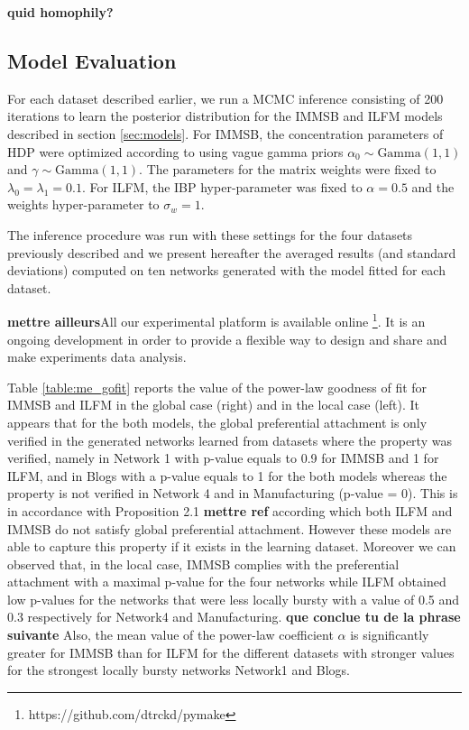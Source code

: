 \textbf{quid homophily?}






\subsection{Model Evaluation}
For each dataset described earlier, we run a MCMC inference consisting of 200 iterations to learn the posterior distribution for the IMMSB and ILFM  models described in section \ref{sec:models}. For IMMSB, the concentration parameters of HDP were optimized according to  \cite{HDP} using vague gamma priors $\alpha_0 \sim \text{Gamma}(1,1)$ and $\gamma \sim \text{Gamma}(1,1)$. The parameters for the matrix weights were fixed to $\lambda_0=\lambda_1=0.1$. For ILFM, the IBP hyper-parameter was fixed to $\alpha=0.5$ and the weights hyper-parameter to $\sigma_w = 1$. 

The inference procedure was run with these settings for the four datasets previously described and we present hereafter the averaged results (and standard deviations) computed on ten networks generated with the model fitted for each dataset.

\textbf{mettre ailleurs}All our experimental platform is available online \footnote{https://github.com/dtrckd/pymake}. It is an ongoing development in order to provide a flexible way to design and share and make experiments data analysis.

Table \ref{table:me_gofit} reports the value of the power-law goodness of fit for IMMSB and ILFM in the global case (right) and in the local case (left). It appears that for the both models, the global preferential attachment is only verified in the generated networks learned from datasets where the property was verified, namely in Network 1 with p-value equals to 0.9 for IMMSB and 1 for ILFM, and in Blogs with a p-value equals to 1 for the both models whereas the property is not verified in Network 4 and in Manufacturing (p-value = 0). This is in accordance with Proposition 2.1 \textbf{mettre ref} according which both ILFM and IMMSB do not satisfy global preferential attachment. However these models are able to capture this property if it exists in the learning dataset.  Moreover we can observed that, in the local case, IMMSB complies with the preferential attachment with a maximal p-value for the four networks while ILFM obtained low p-values for the networks that were less locally bursty with a value of 0.5 and 0.3 respectively for Network4 and Manufacturing. \textbf{que conclue tu de la phrase suivante} Also, the mean value of the power-law coefficient $\alpha$ is significantly greater for IMMSB than for ILFM for the different datasets with stronger values for the strongest locally bursty networks Network1 and Blogs.

